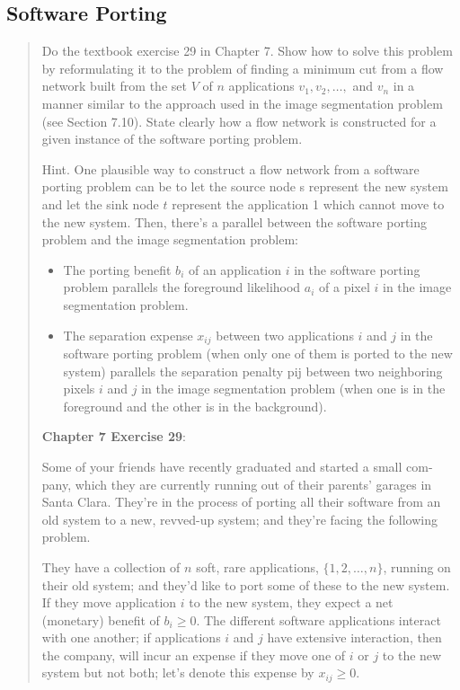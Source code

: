 \documentclass[
]{article}
\providecommand{\tightlist}{%
  \setlength{\itemsep}{0pt}\setlength{\parskip}{0pt}}
\begin{document}
\subsection{Software Porting}\label{software-porting}

\begin{quote}
Do the textbook exercise 29 in Chapter 7. Show how to solve this problem
by reformulating it to the problem of finding a minimum cut from a flow
network built from the set \(V\) of \(n\) applications
\(v_{1},v_{2},\dots,\) and \(v_{n}\) in a manner similar to the approach
used in the image segmentation problem (see Section 7.10). State clearly
how a flow network is constructed for a given instance of the software
porting problem.

Hint. One plausible way to construct a flow network from a software
porting problem can be to let the source node s represent the new system
and let the sink node \(t\) represent the application 1 which cannot
move to the new system. Then, there's a parallel between the software
porting problem and the image segmentation problem:

\begin{itemize}
\tightlist
\item
  The porting benefit \(b_{i}\) of an application \(i\) in the software
  porting problem parallels the foreground likelihood \(a_{i}\) of a
  pixel \(i\) in the image segmentation problem.
\item
  The separation expense \(x_{ij}\) between two applications \(i\) and
  \(j\) in the software porting problem (when only one of them is ported
  to the new system) parallels the separation penalty pij between two
  neighboring pixels \(i\) and \(j\) in the image segmentation problem
  (when one is in the foreground and the other is in the background).
\end{itemize}

\textbf{Chapter 7 Exercise 29}:

Some of your friends have recently graduated and started a small com-
pany, which they are currently running out of their parents' garages in
Santa Clara. They're in the process of porting all their software from
an old system to a new, revved-up system; and they're facing the
following problem.

They have a collection of \(n\) soft, rare applications,
\(\{ 1,2,\dots,n \}\), running on their old system; and they'd like to
port some of these to the new system. If they move application \(i\) to
the new system, they expect a net (monetary) benefit of \(b_{i}\geq 0\).
The different software applications interact with one another; if
applications \(i\) and \(j\) have extensive interaction, then the
company, will incur an expense if they move one of \(i\) or \(j\) to the
new system but not both; let's denote this expense by \(x_{ij}\geq 0\).


\end{quote}
\end{document}
